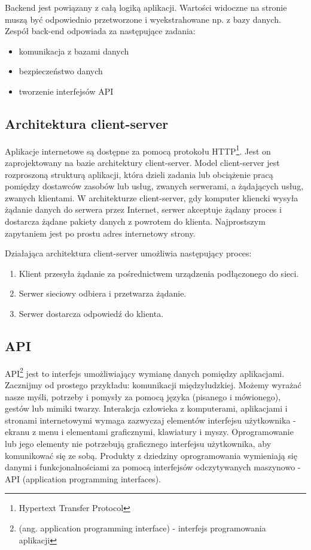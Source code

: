 Backend jest powiązany z całą logiką aplikacji. Wartości widoczne na stronie muszą być odpowiednio przetworzone i wyekstrahowane np. z bazy danych. Zespół back-end odpowiada za następujące zadania:
\begin{itemize}
    \item komunikacja z bazami danych
    \item bezpieczeństwo danych
    \item tworzenie interfejsów API
\end{itemize}


\subsection{Architektura client-server}
Aplikacje internetowe są dostępne za pomocą protokołu HTTP\footnote{Hypertext Transfer Protocol}. Jest on zaprojektowany na bazie architektury client-server. Model client-server jest rozproszoną strukturą aplikacji, która dzieli zadania lub obciążenie pracą pomiędzy dostawców zasobów lub usług, zwanych serwerami, a żądających usług, zwanych klientami. W architekturze client-server, gdy komputer kliencki wysyła żądanie danych do serwera przez Internet, serwer akceptuje żądany proces i dostarcza żądane pakiety danych z powrotem do klienta. Najprostszym zapytaniem jest po prostu adres internetowy strony.

Działająca architektura client-server umożliwia następujący proces:

\begin{enumerate}
    \item Klient przesyła żądanie za pośrednictwem urządzenia podłączonego do sieci.
    \item Serwer sieciowy odbiera i przetwarza żądanie.
    \item Serwer dostarcza odpowiedź do klienta.
\end{enumerate}

\subsection{API}
API\footnote{(ang. application programming interface) - interfejs programowania aplikacji} jest to interfejs umożliwiający wymianę danych pomiędzy aplikacjami.
Zacznijmy od prostego przykładu: komunikacji międzyludzkiej. Możemy wyrażać nasze myśli, potrzeby i pomysły za pomocą języka (pisanego i mówionego), gestów lub mimiki twarzy. Interakcja człowieka z komputerami, aplikacjami i stronami internetowymi wymaga zazwyczaj elementów interfejsu użytkownika - ekranu z menu i elementami graficznymi, klawiatury i myszy. Oprogramowanie lub jego elementy nie potrzebują graficznego interfejsu użytkownika, aby komunikować się ze sobą. Produkty z dziedziny oprogramowania wymieniają się danymi i funkcjonalnościami za pomocą interfejsów odczytywanych maszynowo - API (application programming interfaces).


